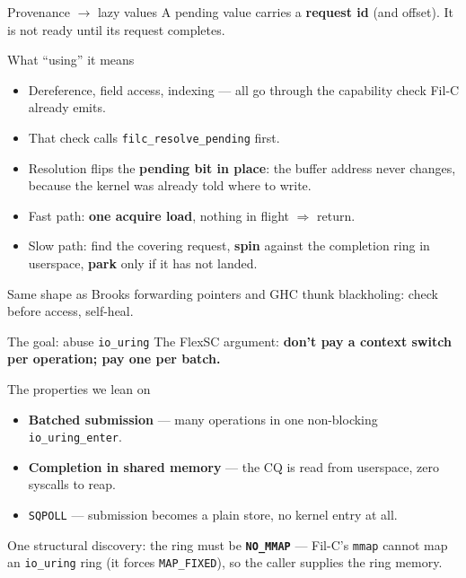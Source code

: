 \documentclass[aspectratio=169]{beamer}
\begin{document}
\begin{frame}{Provenance $\rightarrow$ lazy values}
  A pending value carries a \textbf{request id} (and offset). It is not ready until its request completes.

  \begin{block}{What ``using'' it means}
    \begin{itemize}
      \item Dereference, field access, indexing --- all go through the capability check Fil-C already emits.
      \item That check calls \texttt{filc\_resolve\_pending} first.
      \item Resolution flips the \textbf{pending bit in place}: the buffer address never changes, because the kernel was already told where to write.
    \end{itemize}
  \end{block}

  \begin{itemize}
    \item Fast path: \textbf{one acquire load}, nothing in flight $\Rightarrow$ return.
    \item Slow path: find the covering request, \textbf{spin} against the completion ring in userspace, \textbf{park} only if it has not landed.
  \end{itemize}

  \small Same shape as Brooks forwarding pointers and GHC thunk blackholing: check before access, self-heal.
\end{frame}

\begin{frame}{The goal: abuse \texttt{io\_uring}}
  The FlexSC argument: \textbf{don't pay a context switch per operation; pay one per batch.}

  \begin{block}{The properties we lean on}
    \begin{itemize}
      \item \textbf{Batched submission} --- many operations in one non-blocking \texttt{io\_uring\_enter}.
      \item \textbf{Completion in shared memory} --- the CQ is read from userspace, zero syscalls to reap.
      \item \texttt{SQPOLL} --- submission becomes a plain store, no kernel entry at all.
    \end{itemize}
  \end{block}

  \vspace{4pt}
  One structural discovery: the ring must be \textbf{\texttt{NO\_MMAP}} --- Fil-C's \texttt{mmap} cannot map an \texttt{io\_uring} ring (it forces \texttt{MAP\_FIXED}), so the caller supplies the ring memory.
\end{frame}
\end{document}
